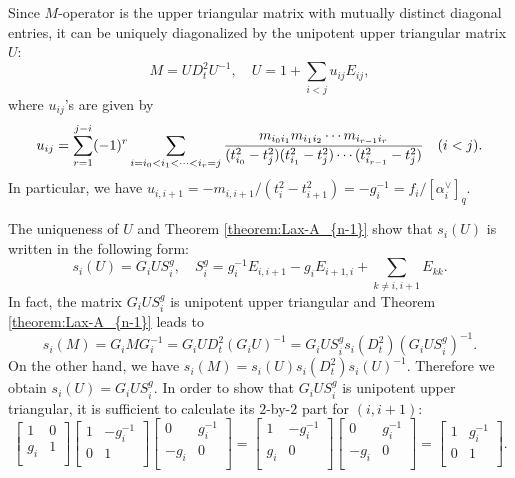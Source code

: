 \documentclass[12pt,twoside]{article}
\newcommand\av{\alpha^\vee}
\theoremstyle{plain} %
\theoremstyle{definition} %
\theoremstyle{definition} %
\numberwithin{theorem}{section}
\numberwithin{equation}{section}
\numberwithin{figure}{section}
\numberwithin{table}{section}
\newcommand\theoremref[1]{Theorem \ref{#1}}
\begin{document}
Since $M$-operator is the upper triangular matrix with
mutually distinct diagonal entries, 
it can be uniquely diagonalized 
by the unipotent upper triangular matrix $U$:
\begin{equation*}
 M = U D_t^2 U^{-1}, \quad
 U = 1 + \sum_{i<j} u_{ij} E_{ij},
\end{equation*}
where $u_{ij}$'s are given by
\begin{equation}
 u_{ij} 
 = \sum_{r=1}^{j-i}(-1)^r
   \sum_{i=i_0<i_1<\cdots<i_r=j}
   \frac{m_{i_0i_1}m_{i_1i_2}\cdots m_{i_{r-1}i_r}}
        {(t_{i_0}^2-t_j^2)(t_{i_1}^2-t_j^2)\cdots(t_{i_{r-1}}^2-t_j^2)}
 \quad (i<j).
 \label{eq:u_{ij}}
\end{equation}
In particular, we have 
$u_{i,i+1} = -m_{i,i+1}/(t_i^2-t_{i+1}^2)=-g_i^{-1} = f_i/[\av_i]_q$. 

The uniqueness of $U$ and \theoremref{theorem:Lax-A_{n-1}} show that
$s_i(U)$ is written in the following form:
\begin{equation}
 s_i(U) = G_i U S_i^g, \quad
 S_i^g = g_i^{-1} E_{i,i+1} - g_i E_{i+1,i} + \sum_{k\ne i,i+1} E_{kk}.
 \label{eq:s_i(U)}
\end{equation}
In fact, the matrix $G_i U S_i^g$ is unipotent upper triangular 
and \theoremref{theorem:Lax-A_{n-1}} leads to
\begin{equation*}
 s_i(M) 
 = G_i M G_i^{-1}
 = G_i U D_t^2 (G_i U)^{-1}
 = G_i U S_i^g s_i(D_t^2) (G_i U S_i^g)^{-1}.
\end{equation*}
On the other hand, we have $s_i(M)=s_i(U)s_i(D_t^2)s_i(U)^{-1}$.
Therefore we obtain $s_i(U)=G_i U S_i^g$.
In order to show that $G_i U S_i^g$ is unipotent upper triangular, 
it is sufficient to calculate its $2$-by-$2$ part for $(i,i+1)$:
\begin{equation*}
 \begin{bmatrix}
   1   & 0 \\
   g_i & 1 \\ 
 \end{bmatrix}
 \begin{bmatrix}
   1   &  -g_i^{-1} \\
   0   &   1        \\
 \end{bmatrix}
 \begin{bmatrix}
   0   & g_i^{-1} \\
  -g_i &  0       \\
 \end{bmatrix}
 =
 \begin{bmatrix}
    1   &  -g_i^{-1} \\
   g_i  &  0         \\
 \end{bmatrix}
 \begin{bmatrix}
   0   & g_i^{-1} \\
  -g_i &  0       \\
 \end{bmatrix}
 =
 \begin{bmatrix}
   1   &  g_i^{-1} \\
   0   &   1        \\
 \end{bmatrix}. 
\end{equation*}
\end{document}
